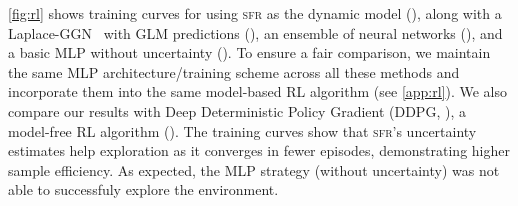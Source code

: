 \documentclass{article}
\newcommand{\our}{\textsc{sfr}\xspace}
\begin{document}

\cref{fig:rl} shows training curves for using \our as the dynamic model (), along with a Laplace-GGN~\cite{immer2021scalable} with GLM predictions (), an ensemble of neural networks (), and a basic MLP without uncertainty (). To ensure a fair comparison, we maintain the same MLP architecture/training scheme across all these methods and incorporate them into the same model-based RL algorithm (see \cref{app:rl}). We also compare our results with Deep Deterministic Policy Gradient (DDPG, \cite{lillicrapContinuousControlDeep2016}), a model-free RL algorithm ().
The training curves show that \our's uncertainty estimates help exploration as it converges in fewer episodes, demonstrating higher sample efficiency.
As expected, the MLP strategy (without uncertainty) was not able to successfuly explore the environment.






\end{document}
